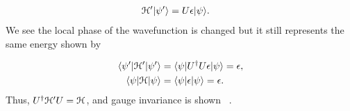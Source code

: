 \begin{align}
  \mathcal{H}' |\psi'\rangle &= U \epsilon |\psi\rangle.
\end{align}
We see the local phase of the wavefunction is changed but it still represents the same energy shown by

\begin{align}
  \langle \psi'| \mathcal{H}' |\psi'\rangle &= \langle \psi | U^{\dagger} U \epsilon |\psi \rangle = \epsilon, \nonumber \\
  \langle \psi | \mathcal{H} |\psi \rangle &= \langle \psi | \epsilon |\psi \rangle = \epsilon. \end{align}
Thus,
$U^{\dagger} \mathcal{H}' U = \mathcal{H}$, and gauge invariance is shown ~\cite{kittelIntroductionSolidState2018}.

